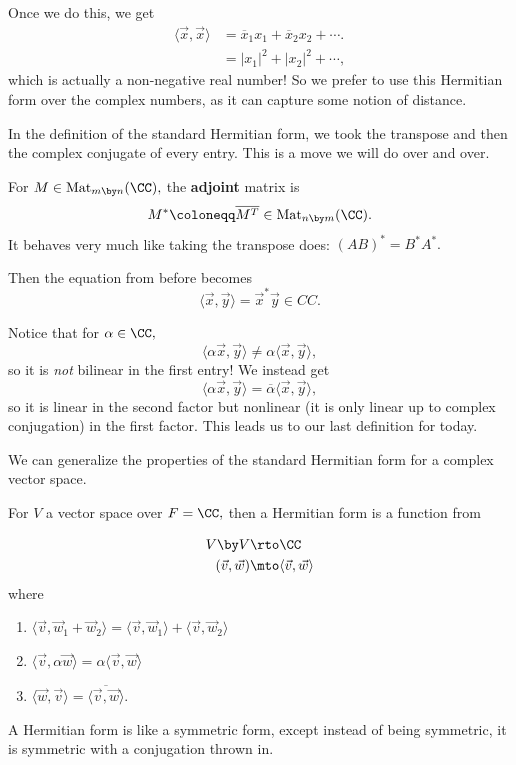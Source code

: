 Once we do this, we get 
\begin{align*}
    \langle \vec{x}, \vec{x} \rangle &= \overline{x}_1x_1 + \overline{x}_2x_2 + \cdots. \\
    &= |x_1|^2 + |x_2|^2 + \cdots,
\end{align*}
which is actually a non-negative real number! So we prefer to use this Hermitian form over the complex numbers, as it can capture some notion of distance.

In the definition of the standard Hermitian form, we took the transpose and then the complex conjugate of every entry. This is a move we will do over and over. 

\begin{definition}
For $M \in \text{Mat}_{m \by n}(\CC),$ the \textbf{adjoint} matrix is 
\[
M^* \coloneqq \overline{M^T} \in \text{Mat}_{n \by m}(\CC).
\]
It behaves very much like taking the transpose does: $(AB)^* = B^*A^*.$
\end{definition}

Then the equation from before becomes
\[
\langle \vec{x}, \vec{y} \rangle = \vec{x}^*\vec{y} \in CC.
\]

Notice that for $\alpha \in \CC,$
\[
\langle \alpha \vec{x}, \vec{y} \rangle \neq \alpha\langle \vec{x}, \vec{y} \rangle,
\]
so it is \emph{not} bilinear in the first entry! We instead get 
\[
\langle \alpha \vec{x}, \vec{y} \rangle = \overline{\alpha}\langle \vec{x}, \vec{y} \rangle,
\]
so it is linear in the second factor but nonlinear (it is only linear up to complex conjugation) in the first factor. This leads us to our last definition for today. 

We can generalize the properties of the standard Hermitian form for a complex vector space. 

\begin{definition}
For $V$ a vector space over $F = \CC,$ then a Hermitian form is a function from 

\begin{align*}
    V \by V &\rto \CC \\
    (\vec{v}, \vec{w}) &\mto \langle \vec{v}, \vec{w} \rangle
\end{align*}
where 
\begin{enumerate}
    \item $\langle \vec{v}, \vec{w}_1 + \vec{w}_2 \rangle = \langle \vec{v}, \vec{w}_1 \rangle + \langle \vec{v}, \vec{w}_2 \rangle$ 
    
    \item $\langle \vec{v}, \alpha\vec{w} \rangle = \alpha \langle \vec{v}, \vec{w} \rangle$
    
    \item $\langle \vec{w}, \vec{v} \rangle = \overline{\langle \vec{v}, \vec{w} \rangle}$. 
\end{enumerate}
A Hermitian form is like a symmetric form, except instead of being symmetric, it is symmetric with a conjugation thrown in.
\end{definition}


